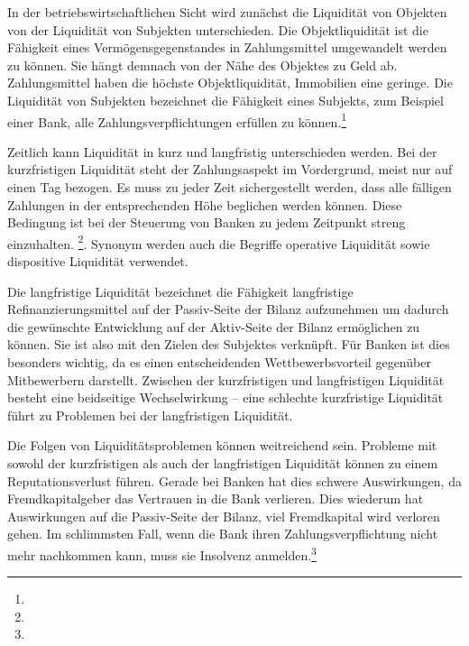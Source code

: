 \begin{onehalfspacing}
In der betriebswirtschaftlichen Sicht wird zunächst die Liquidität von Objekten von der Liquidität von Subjekten unterschieden. Die Objektliquidität ist die Fähigkeit eines Vermögensgegenstandes in Zahlungsmittel umgewandelt werden zu können. Sie hängt demnach von der Nähe des Objektes zu Geld ab. Zahlungsmittel haben die höchste Objektliquidität, Immobilien eine geringe. Die Liquidität von Subjekten bezeichnet die Fähigkeit eines Subjekts, zum Beispiel einer Bank, alle Zahlungsverpflichtungen erfüllen zu können.\footnote{ }

Zeitlich kann Liquidität in kurz und langfristig unterschieden werden. Bei der kurzfristigen Liquidität steht der Zahlungsaspekt im Vordergrund, meist nur auf einen Tag bezogen. Es muss zu jeder Zeit sichergestellt werden, dass alle fälligen Zahlungen in der entsprechenden Höhe beglichen werden können. Diese Bedingung ist bei der Steuerung von Banken zu jedem Zeitpunkt streng einzuhalten. \footnote{ }. Synonym werden auch die Begriffe operative Liquidität sowie dispositive Liquidität verwendet.

Die langfristige Liquidität bezeichnet die Fähigkeit langfristige Refinanzierungsmittel auf der Passiv-Seite der Bilanz aufzunehmen um dadurch die gewünschte Entwicklung auf der Aktiv-Seite der Bilanz ermöglichen zu können. Sie ist also mit den Zielen des Subjektes verknüpft. Für Banken ist dies besonders wichtig, da es einen entscheidenden Wettbewerbsvorteil gegenüber Mitbewerbern darstellt. Zwischen der kurzfristigen und langfristigen Liquidität besteht eine beidseitige Wechselwirkung -- eine schlechte kurzfristige Liquidität führt zu Problemen bei der langfristigen Liquidität.

Die Folgen von Liquiditätsproblemen können weitreichend sein. Probleme mit sowohl der kurzfristigen als auch der langfristigen Liquidität können zu einem Reputationsverlust führen. Gerade bei Banken hat dies schwere Auswirkungen, da Fremdkapitalgeber das Vertrauen in die Bank verlieren. Dies wiederum hat Auswirkungen auf die Passiv-Seite der Bilanz, viel Fremdkapital wird verloren gehen. Im schlimmsten Fall, wenn die Bank ihren Zahlungsverpflichtung nicht mehr nachkommen kann, muss sie Insolvenz anmelden.\footnote{ }


\end{onehalfspacing}

